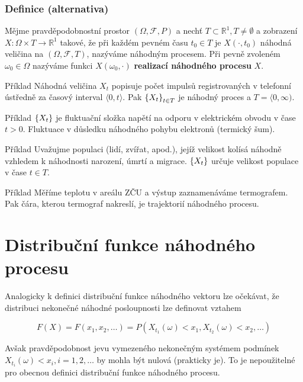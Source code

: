 \subsubsection{Definice (alternativa)}
Mějme pravděpodobnostní prostor $(\Omega,\mathscr{F},P)$ a nechť $T\subset\mathbb{R}^1,T\neq\emptyset$ a zobrazení $X:\Omega\times T\to\mathbb{R}^1$ takové, že při každém pevném času $t_0\in T$ je $X(\cdot,t_0)$ náhodná veličina na $(\Omega,\mathscr{F},T)$, nazýváme náhodným procesem. Při pevně zvoleném $\omega_0\in\Omega$ nazýváme funkci $X(\omega_0,\cdot)$ \textbf{realizací náhodného procesu} $X$.

\begin{note}{Příklad}
Náhodná veličina $X_t$ popisuje počet impulsů registrovaných v telefonní ústředně za časový interval $\langle 0,t\rangle$. Pak $\left\{X_t\right\}_{t\in T}$ je náhodný proces a $T=\langle0,\infty)$.
\end{note}

\begin{note}{Příklad}
$\left\{X_t\right\}$ je fluktuační složka napětí na odporu v elektrickém obvodu v čase $t>0$. Fluktuace v důsledku náhodného pohybu elektronů (termický šum).
\end{note}

\begin{note}{Příklad}
Uvažujme populaci (lidí, zvířat, apod.), jejíž velikost kolísá náhodně vzhledem k náhodnosti narození, úmrtí a migrace. $\left\{X_t\right\}$ určuje velikost populace v čase $t\in T$.
\end{note}

\begin{note}{Příklad}
Měříme teplotu v areálu ZČU a výstup zaznamenáváme termografem. Pak čára, kterou termograf nakreslí, je trajektorií náhodného procesu.
\end{note}

\section{Distribuční funkce náhodného procesu}
Analogicky k definici distribuční funkce náhodného vektoru lze očekávat, že distribuci nekonečné náhodné posloupnosti lze definovat vztahem

\[ F(X) = F(x_1,x_2,\ldots)=P(X_{t_1}(\omega)<x_1, X_{t_2}(\omega)<x_2,\ldots) \]

Avšak pravděpodobnost jevu vymezeného nekonečným systémem podmínek $X_{t_i}(\omega)<x_i,i=1,2,\ldots$ by mohla být nulová (prakticky je). To je nepoužitelné pro obecnou definici distribuční funkce náhodného procesu.\br

